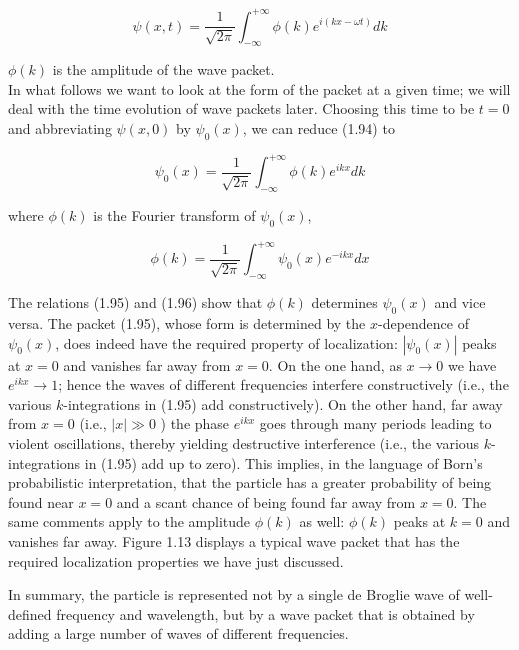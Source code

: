 \documentclass[10pt]{article}
\begin{document}
\begin{equation*}
\psi(x, t)=\frac{1}{\sqrt{2 \pi}} \int_{-\infty}^{+\infty} \phi(k) e^{i(k x-\omega t)} d k \tag{1.94}
\end{equation*}


$\phi(k)$ is the amplitude of the wave packet.\\
In what follows we want to look at the form of the packet at a given time; we will deal with the time evolution of wave packets later. Choosing this time to be $t=0$ and abbreviating $\psi(x, 0)$ by $\psi_{0}(x)$, we can reduce (1.94) to


\begin{equation*}
\psi_{0}(x)=\frac{1}{\sqrt{2 \pi}} \int_{-\infty}^{+\infty} \phi(k) e^{i k x} d k \tag{1.95}
\end{equation*}


where $\phi(k)$ is the Fourier transform of $\psi_{0}(x)$,


\begin{equation*}
\phi(k)=\frac{1}{\sqrt{2 \pi}} \int_{-\infty}^{+\infty} \psi_{0}(x) e^{-i k x} d x \tag{1.96}
\end{equation*}


The relations (1.95) and (1.96) show that $\phi(k)$ determines $\psi_{0}(x)$ and vice versa. The packet (1.95), whose form is determined by the $x$-dependence of $\psi_{0}(x)$, does indeed have the required property of localization: $\left|\psi_{0}(x)\right|$ peaks at $x=0$ and vanishes far away from $x=0$. On the one hand, as $x \rightarrow 0$ we have $e^{i k x} \rightarrow 1$; hence the waves of different frequencies interfere constructively (i.e., the various $k$-integrations in (1.95) add constructively). On the other hand, far away from $x=0$ (i.e., $|x| \gg 0$ ) the phase $e^{i k x}$ goes through many periods leading to violent oscillations, thereby yielding destructive interference (i.e., the various $k$-integrations in (1.95) add up to zero). This implies, in the language of Born's probabilistic interpretation, that the particle has a greater probability of being found near $x=0$ and a scant chance of being found far away from $x=0$. The same comments apply to the amplitude $\phi(k)$ as well: $\phi(k)$ peaks at $k=0$ and vanishes far away. Figure 1.13 displays a typical wave packet that has the required localization properties we have just discussed.

In summary, the particle is represented not by a single de Broglie wave of well-defined frequency and wavelength, but by a wave packet that is obtained by adding a large number of waves of different frequencies.
\end{document}

